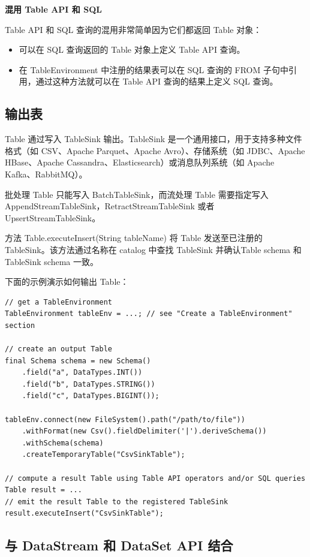 \documentclass[cn,11pt,chinese]{elegantbook}
\begin{document}
\textbf{混用 Table API 和 SQL}

Table API 和 SQL 查询的混用非常简单因为它们都返回 Table 对象：

\begin{itemize}
    \item 可以在 SQL 查询返回的 Table 对象上定义 Table API 查询。
    \item 在 TableEnvironment 中注册的结果表可以在 SQL 查询的 FROM 子句中引用，通过这种方法就可以在 Table API 查询的结果上定义 SQL 查询。
\end{itemize}

\subsection{输出表}

Table 通过写入 TableSink 输出。TableSink 是一个通用接口，用于支持多种文件格式（如 CSV、Apache Parquet、Apache Avro）、存储系统（如 JDBC、Apache HBase、Apache Cassandra、Elasticsearch）或消息队列系统（如 Apache Kafka、RabbitMQ）。

批处理 Table 只能写入 BatchTableSink，而流处理 Table 需要指定写入 AppendStreamTableSink，RetractStreamTableSink 或者 UpsertStreamTableSink。

方法 Table.executeInsert(String tableName) 将 Table 发送至已注册的 TableSink。该方法通过名称在 catalog 中查找 TableSink 并确认Table schema 和 TableSink schema 一致。

下面的示例演示如何输出 Table：

\begin{verbatim}
// get a TableEnvironment
TableEnvironment tableEnv = ...; // see "Create a TableEnvironment" section

// create an output Table
final Schema schema = new Schema()
    .field("a", DataTypes.INT())
    .field("b", DataTypes.STRING())
    .field("c", DataTypes.BIGINT());

tableEnv.connect(new FileSystem().path("/path/to/file"))
    .withFormat(new Csv().fieldDelimiter('|').deriveSchema())
    .withSchema(schema)
    .createTemporaryTable("CsvSinkTable");

// compute a result Table using Table API operators and/or SQL queries
Table result = ...
// emit the result Table to the registered TableSink
result.executeInsert("CsvSinkTable");
\end{verbatim}

\subsection{与 DataStream 和 DataSet API 结合}
\end{document}
